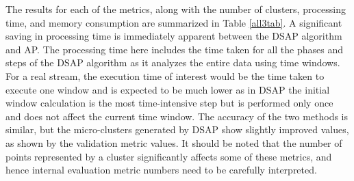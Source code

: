 




The results for each of the metrics, along with the number of clusters, processing time, and memory consumption are summarized in Table \ref{all3tab}. A significant saving in processing time is immediately apparent between the DSAP algorithm and AP. The processing time here includes the time taken for all the phases and steps of the DSAP algorithm as it analyzes the entire data using time windows. For a real stream, the execution time of interest would be the time taken to execute one window and is expected to be much lower as in DSAP the initial window calculation is the most time-intensive step but is performed only once and does not affect the current time window. The accuracy of the two methods is similar, but the micro-clusters generated by DSAP show slightly improved values, as shown by the validation metric values. It should be noted that the number of points represented by a cluster significantly affects some of these metrics, and hence internal evaluation metric numbers need to be carefully interpreted.


